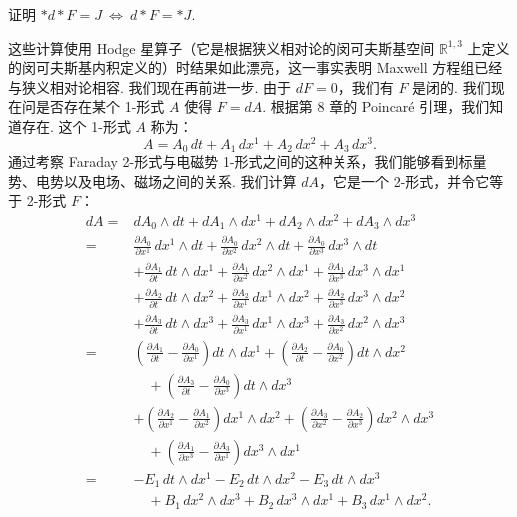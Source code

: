 \begin{center}
\end{center}

\begin{question}\label{q:12-10}
证明 $\ast d\ast F=J\ \Longleftrightarrow\ d\ast F=\ast J$.
\end{question}

这些计算使用 Hodge 星算子（它是根据狭义相对论的闵可夫斯基空间 $\mathbb{R}^{1,3}$ 上定义的闵可夫斯基内积定义的）时结果如此漂亮，这一事实表明 Maxwell 方程组已经与狭义相对论相容. 我们现在再前进一步. 由于 $dF=0$，我们有 $F$ 是闭的. 我们现在问是否存在某个 1-形式 $A$ 使得 $F=dA$. 根据第 8 章的 Poincaré 引理，我们知道存在. 这个 1-形式 $A$ 称为：
\[
A=A_0\,dt+A_1\,dx^1+A_2\,dx^2+A_3\,dx^3 .
\]
通过考察 Faraday 2-形式与电磁势 1-形式之间的这种关系，我们能够看到标量势、电势以及电场、磁场之间的关系. 我们计算 $dA$，它是一个 2-形式，并令它等于 2-形式 $F$：
\[
\begin{aligned}
dA={}&dA_0\wedge dt+dA_1\wedge dx^1+dA_2\wedge dx^2+dA_3\wedge dx^3\\
={}&\frac{\partial A_0}{\partial x^1}\,dx^1\wedge dt+\frac{\partial A_0}{\partial x^2}\,dx^2\wedge dt+\frac{\partial A_0}{\partial x^3}\,dx^3\wedge dt\\
&+\frac{\partial A_1}{\partial t}\,dt\wedge dx^1+\frac{\partial A_1}{\partial x^2}\,dx^2\wedge dx^1+\frac{\partial A_1}{\partial x^3}\,dx^3\wedge dx^1\\
&+\frac{\partial A_2}{\partial t}\,dt\wedge dx^2+\frac{\partial A_2}{\partial x^1}\,dx^1\wedge dx^2+\frac{\partial A_2}{\partial x^3}\,dx^3\wedge dx^2\\
&+\frac{\partial A_3}{\partial t}\,dt\wedge dx^3+\frac{\partial A_3}{\partial x^1}\,dx^1\wedge dx^3+\frac{\partial A_3}{\partial x^2}\,dx^2\wedge dx^3\\
={}&\left(\frac{\partial A_1}{\partial t}-\frac{\partial A_0}{\partial x^1}\right)dt\wedge dx^1+\left(\frac{\partial A_2}{\partial t}-\frac{\partial A_0}{\partial x^2}\right)dt\wedge dx^2\\
&\quad+\left(\frac{\partial A_3}{\partial t}-\frac{\partial A_0}{\partial x^3}\right)dt\wedge dx^3\\
&+\left(\frac{\partial A_2}{\partial x^1}-\frac{\partial A_1}{\partial x^2}\right)dx^1\wedge dx^2+\left(\frac{\partial A_3}{\partial x^2}-\frac{\partial A_2}{\partial x^3}\right)dx^2\wedge dx^3\\
&\quad+\left(\frac{\partial A_1}{\partial x^3}-\frac{\partial A_3}{\partial x^1}\right)dx^3\wedge dx^1\\
={}&-E_1\,dt\wedge dx^1-E_2\,dt\wedge dx^2-E_3\,dt\wedge dx^3\\
&\quad+B_1\,dx^2\wedge dx^3+B_2\,dx^3\wedge dx^1+B_3\,dx^1\wedge dx^2 .
\end{aligned}
\]
